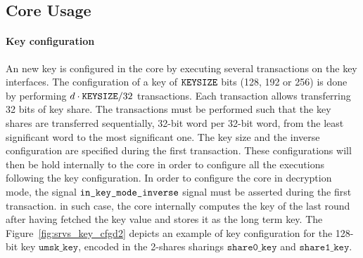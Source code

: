 \documentclass{scrartcl}
\begin{document}
\subsection{Core Usage}
\label{section:core_usage}

\paragraph{Key configuration}
An new key is configured in the core by executing several transactions on the
key interfaces.  The configuration of a key of $\texttt{KEYSIZE}$ bits (128, 192 or
256) is done by performing $d\cdot\texttt{KEYSIZE} / 32$ transactions.  Each
transaction allows transferring 32 bits of key share. The transactions must be
performed such that the key shares are transferred sequentially, 32-bit word per
32-bit word, from the least significant word to the most significant one. The
key size and the inverse configuration are specified during the first
transaction. These configurations will then be hold internally to the core in
order to configure all the executions following the key configuration. In order
to configure the core in decryption mode, the signal $\texttt{in\_key\_mode\_inverse}$
signal must be asserted during the first transaction. in such case, the core
internally computes the key of the last round after having fetched the key
value and stores it as the long term key.  
The Figure~\ref{fig:srvs_key_cfgd2} depicts an example of key configuration for the 128-bit key
$\texttt{umsk\_key}$, encoded in the 2-shares sharings $\texttt{share0\_key}$ and
$\texttt{share1\_key}$.   
\end{document}
